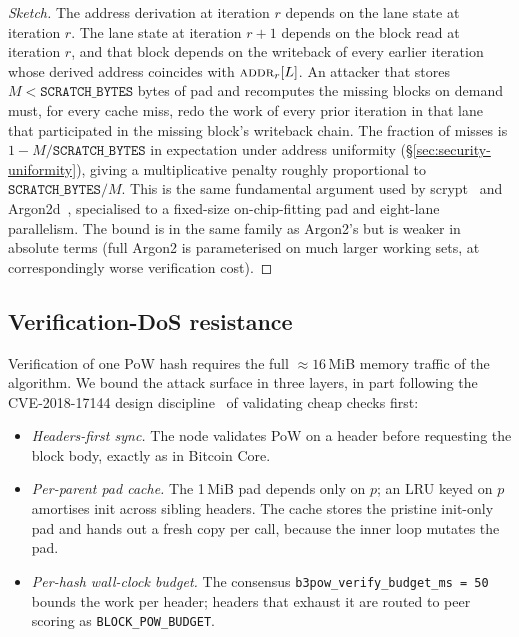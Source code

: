 \documentclass[11pt,a4paper]{article}
\theoremstyle{plain}
\theoremstyle{definition}
\theoremstyle{remark}
\begin{document}
\begin{proof}[Sketch]
The address derivation at iteration $r$ depends on the lane state at
iteration $r$. The lane state at iteration $r{+}1$ depends on the
block read at iteration $r$, and that block depends on the writeback
of every earlier iteration whose derived address coincides with
$\textsc{addr}_r[L]$. An attacker that stores $M < \texttt{SCRATCH\_BYTES}$
bytes of pad and recomputes the missing blocks on demand must, for
every cache miss, redo the work of every prior iteration in that
lane that participated in the missing block's writeback chain. The
fraction of misses is $1 - M / \texttt{SCRATCH\_BYTES}$ in
expectation under address uniformity (\S\ref{sec:security-uniformity}),
giving a multiplicative penalty roughly proportional to
$\texttt{SCRATCH\_BYTES} / M$. This is the same fundamental argument
used by scrypt~\cite{percival2009scrypt} and Argon2d~\cite{biryukov2016argon2},
specialised to a fixed-size on-chip-fitting pad and eight-lane
parallelism. The bound is in the same family as Argon2's but is
weaker in absolute terms (full Argon2 is parameterised on much
larger working sets, at correspondingly worse verification cost).
\end{proof}

\subsection{Verification-DoS resistance}\label{sec:security-verifydos}

Verification of one PoW hash requires the full $\approx 16$\,MiB
memory traffic of the algorithm. We bound the attack surface in
three layers, in part following the CVE-2018-17144 design
discipline~\cite{cve2018-17144} of validating cheap checks first:

\begin{itemize}\itemsep0.2em
\item \emph{Headers-first sync.} The node validates PoW on a header
      before requesting the block body, exactly as in
      Bitcoin Core.
\item \emph{Per-parent pad cache.} The 1\,MiB pad depends only on
      $p$; an LRU keyed on $p$ amortises init across sibling
      headers. The cache stores the pristine init-only pad and
      hands out a fresh copy per call, because the inner loop
      mutates the pad.
\item \emph{Per-hash wall-clock budget.} The consensus
      \texttt{b3pow\_verify\_budget\_ms = 50} bounds the work
      per header; headers that exhaust it are routed to peer
      scoring as \texttt{BLOCK\_POW\_BUDGET}.
\end{itemize}
\end{document}

